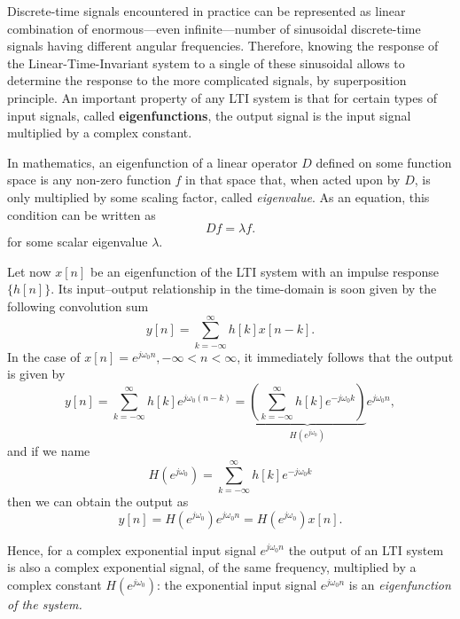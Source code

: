 \documentclass[\documentfontsize, twocolumn]{\classname}
\begin{document}
Discrete-time signals encountered in practice can be represented as linear combination of enormous---even infinite---number of sinusoidal discrete-time signals having different angular frequencies. Therefore, knowing the response of the Linear-Time-Invariant system to a single of these sinusoidal allows to determine the response to the more complicated signals, by superposition principle. An important property of any LTI system is that for certain types of input signals, called \textbf{eigenfunctions}, the output signal is the input signal multiplied by a complex constant.

In mathematics, an eigenfunction of a linear operator $D$ defined on some function space is any non-zero function $f$ in that space that, when acted upon by $D$, is only multiplied by some scaling factor, called \emph{eigenvalue}. As an equation, this condition can be written as
\begin{equation}\label{eqn:eigenFunction}
    Df = \lambda f.
\end{equation}
for some scalar eigenvalue $\lambda$\cite{bib:eigenFunctions}.

Let now $x[n]$ be an eigenfunction of the LTI system with an impulse response $\{h[n]\}$. Its input--output relationship in the time-domain is soon given by the following convolution sum
\[
    y[n] = \sum_{k=-\infty}^\infty h[k]x[n-k].
\]
In the case of $x[n] = e^{j\omega_0 n}, -\infty < n < \infty$, it immediately follows that the output is given by
\[
    y[n] = \sum_{k=-\infty}^\infty h[k]e^{j\omega_0 (n - k)} = \underbrace{\left(\sum_{k=-\infty}^\infty h[k] e^{-j\omega_0 k} \right)}_{H(e^{j\omega_0})} e^{j\omega_0 n},
\]
and if we name
\[
    H(e^{j\omega_0}) = \sum_{k=-\infty}^\infty h[k]e^{-j\omega_0 k}
\]
then we can obtain the output as
\[
    y[n] = H(e^{j\omega_0})e^{j\omega_0 n} = H(e^{j\omega_0})x[n].
\]

Hence, for a complex exponential input signal $e^{j\omega_0 n}$ the output of an LTI system is also a complex exponential signal, of the same frequency, multiplied by a complex constant $H(e^{j\omega_0})$: the exponential input signal $e^{j\omega_0 n}$ is an \emph{eigenfunction of the system.}
\end{document}
